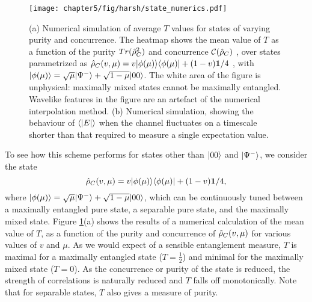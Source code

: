 \begin{figure}[t!]
\centering
\texttt{[image: chapter5/fig/harsh/state\_numerics.pdf]}
\caption[Detecting entanglement in mixed and partially entangled states]{
(a) Numerical simulation of average $T$ values for states of varying purity and concurrence. The heatmap shows the mean value of $T$ as a function of the purity 
$Tr(\hat{\rho}_C^2)$
and concurrence 
$\mathcal{C}(\hat{\rho}_C)$
, over states parametrized as 
$\hat{\rho}_C(v, \mu) = v \mbox{$ | \phi(\mu) \rangle $} \mbox{$ \langle \phi(\mu) | $} + (1-v)\mathbf{1}/4$
, with 
$\mbox{$ | \phi(\mu) \rangle $} = \sqrt{\mu}\mbox{$ | \Psi^- \rangle $} + \sqrt{1-\mu}\mbox{$ | 00 \rangle $}$.
The white area of the figure is unphysical:  maximally mixed states cannot be maximally entangled. Wavelike features in the figure are an artefact of the numerical interpolation method. (b) Numerical simulation, showing the behaviour of $\langle |E| \rangle$ when the channel fluctuates on a timescale shorter than that required to measure a single expectation value.
\label{fig:harsh-noisy-states}
}
\end{figure}


To see how this scheme performs for states other than $\mbox{$ | 00 \rangle $}$ and $\mbox{$ | \Psi^- \rangle $}$, we consider the state
\begin{equation}
    \hat{\rho}_C(v, \mu) = v \mbox{$ | \phi(\mu) \rangle $} \mbox{$ \langle \phi(\mu) | $} + (1-v)\mathbf{1}/4,
\end{equation}
 where 
$\mbox{$ | \phi(\mu) \rangle $} = \sqrt{\mu}\mbox{$ | \Psi^- \rangle $} + \sqrt{1-\mu}\mbox{$ | 00 \rangle $}$,  which can be continuously tuned between a maximally entangled pure state, a separable pure state, and the maximally mixed state. Figure \ref{fig:harsh-noisy-states}(a) shows the results of a numerical calculation of the mean value of $T$, as a function of the purity and concurrence of $\hat{\rho}_C(v, \mu)$ for various values of $v$ and $\mu$. As we would expect of a sensible entanglement measure, $T$ is maximal for a maximally entangled state ($T=\frac{1}{2}$) and minimal for the maximally mixed state ($T=0$). As the concurrence or purity of the state is reduced, the strength of correlations is naturally reduced and $T$ falls off monotonically. Note that for separable states, $T$ also gives a measure of purity.

